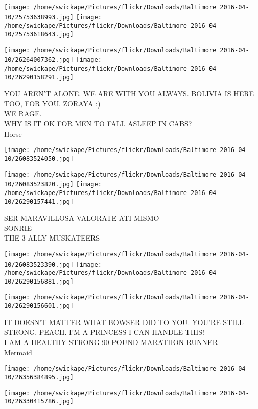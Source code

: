 \documentclass[10pt,letterpaper]{article}
\begin{document}
\texttt{[image: /home/swickape/Pictures/flickr/Downloads/Baltimore 2016-04-10/25753638993.jpg]}
\texttt{[image: /home/swickape/Pictures/flickr/Downloads/Baltimore 2016-04-10/25753618643.jpg]}

\texttt{[image: /home/swickape/Pictures/flickr/Downloads/Baltimore 2016-04-10/26264007362.jpg]}
\texttt{[image: /home/swickape/Pictures/flickr/Downloads/Baltimore 2016-04-10/26290158291.jpg]}

YOU AREN'T ALONE.  WE ARE WITH YOU ALWAYS.  BOLIVIA IS HERE TOO, FOR YOU.  ZORAYA :)\\
WE RAGE.\\
WHY IS IT OK FOR MEN TO FALL ASLEEP IN CABS?\\
Horse
\pagebreak

\texttt{[image: /home/swickape/Pictures/flickr/Downloads/Baltimore 2016-04-10/26083524050.jpg]}

\vspace{0.25in}
\texttt{[image: /home/swickape/Pictures/flickr/Downloads/Baltimore 2016-04-10/26083523820.jpg]}
\texttt{[image: /home/swickape/Pictures/flickr/Downloads/Baltimore 2016-04-10/26290157441.jpg]}

SER MARAVILLOSA VALORATE ATI MISMO\\
SONRIE\\
THE 3 ALLY MUSKATEERS
\pagebreak

\texttt{[image: /home/swickape/Pictures/flickr/Downloads/Baltimore 2016-04-10/26083523390.jpg]}
\texttt{[image: /home/swickape/Pictures/flickr/Downloads/Baltimore 2016-04-10/26290156881.jpg]}

\texttt{[image: /home/swickape/Pictures/flickr/Downloads/Baltimore 2016-04-10/26290156601.jpg]}

IT DOESN'T MATTER WHAT BOWSER DID TO YOU.  YOU'RE STILL STRONG, PEACH.  I'M A PRINCESS I CAN HANDLE THIS!\\
I AM A HEALTHY STRONG 90 POUND MARATHON RUNNER\\
Mermaid
\pagebreak

\texttt{[image: /home/swickape/Pictures/flickr/Downloads/Baltimore 2016-04-10/26356384895.jpg]}

\vspace{0.25in}
\texttt{[image: /home/swickape/Pictures/flickr/Downloads/Baltimore 2016-04-10/26330415786.jpg]}
\end{document}
